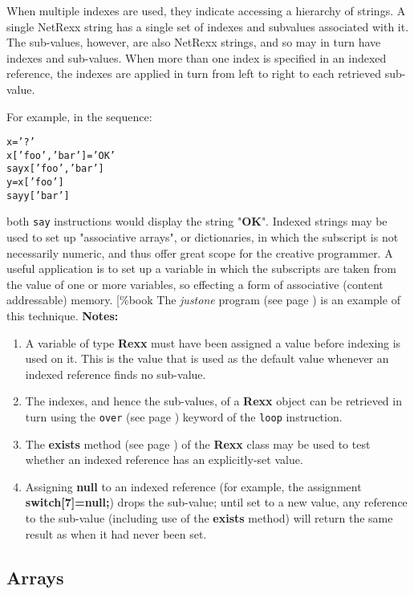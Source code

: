When multiple indexes are used, they indicate accessing a hierarchy of
strings.  A single NetRexx string has a single set of indexes and
subvalues associated with it.  The sub-values, however, are also NetRexx
strings, and so may in turn have indexes and sub-values.  When more than
one index is specified in an indexed reference, the indexes are applied
in turn from left to right to each retrieved sub-value.
 
For example, in the sequence:
\begin{alltt}
x='?'
x['foo', 'bar']='OK'
say x['foo', 'bar']
y=x['foo']
say y['bar']
\end{alltt}
both \texttt{say} instructions would display the string
"\textbf{OK}".
 Indexed strings may be used to set up "associative arrays", or
dictionaries, in which the subscript is not necessarily numeric, and
thus offer great scope for the creative programmer.
A useful application is to set up a variable in which the subscripts
are taken from the value of one or more variables, so effecting a form
of associative (content addressable) memory.
[\%book
The  \emph{justone} program (see page \pageref{refjust1})  is an example of this
technique.
 \textbf{Notes:}
\begin{enumerate}
\item 
A variable of type \textbf{Rexx} must have been assigned a value
before indexing is used on it.
This is the value that is used as the default value whenever an indexed
reference finds no sub-value.
\item 
The indexes, and hence the sub-values, of a \textbf{Rexx} object can
be retrieved in turn using the  \texttt{over} (see page \pageref{refloopov})  keyword
of the \texttt{loop} instruction.
\item 
The  \textbf{exists} method (see page \pageref{refexists})  of the \textbf{Rexx}
class may be used to test whether an indexed reference has an
explicitly-set value.
\item 
Assigning \textbf{null} to an indexed reference (for example, the
assignment \textbf{switch[7]=null;}) drops the sub-value;
until set to a new value, any reference to the sub-value (including use
of the \textbf{exists} method) will return the same result as
when it had never been set.
\end{enumerate}
\subsection{Arrays}\label{"id"}
 

